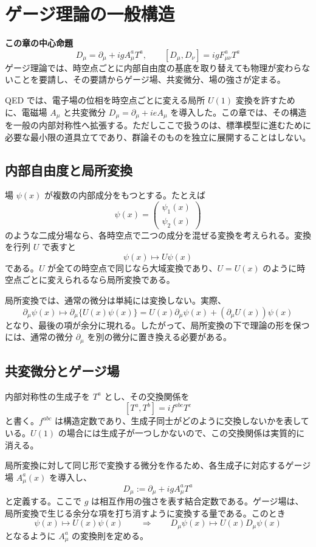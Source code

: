 \section{ゲージ理論の一般構造}

\noindent\textbf{この章の中心命題}
\[
\boxed{
D_\mu=\partial_\mu+igA_\mu^aT^a,
\qquad
[D_\mu,D_\nu]=igF_{\mu\nu}^aT^a
}
\]
ゲージ理論では、時空点ごとに内部自由度の基底を取り替えても物理が変わらないことを要請し、その要請からゲージ場、共変微分、場の強さが定まる。

QED では、電子場の位相を時空点ごとに変える局所 $U(1)$ 変換を許すために、電磁場 $A_\mu$ と共変微分 $D_\mu=\partial_\mu+ieA_\mu$ を導入した。この章では、その構造を一般の内部対称性へ拡張する。ただしここで扱うのは、標準模型に進むために必要な最小限の道具立てであり、群論そのものを独立に展開することはしない。

\subsection{内部自由度と局所変換}
場 $\psi(x)$ が複数の内部成分をもつとする。たとえば
\[
\psi(x)=
\begin{pmatrix}
\psi_1(x)\\
\psi_2(x)
\end{pmatrix}
\]
のような二成分場なら、各時空点で二つの成分を混ぜる変換を考えられる。変換を行列 $U$ で表すと
\[
\psi(x)\mapsto U\psi(x)
\]
である。$U$ が全ての時空点で同じなら大域変換であり、$U=U(x)$ のように時空点ごとに変えられるなら局所変換である。

局所変換では、通常の微分は単純には変換しない。実際、
\[
\partial_\mu\psi(x)
\mapsto
\partial_\mu\{U(x)\psi(x)\}
=
U(x)\partial_\mu\psi(x)+(\partial_\mu U(x))\psi(x)
\]
となり、最後の項が余分に現れる。したがって、局所変換の下で理論の形を保つには、通常の微分 $\partial_\mu$ を別の微分に置き換える必要がある。

\subsection{共変微分とゲージ場}
内部対称性の生成子を $T^a$ とし、その交換関係を
\[
[T^a,T^b]=if^{abc}T^c
\]
と書く。$f^{abc}$ は構造定数であり、生成子同士がどのように交換しないかを表している。$U(1)$ の場合には生成子が一つしかないので、この交換関係は実質的に消える。

局所変換に対して同じ形で変換する微分を作るため、各生成子に対応するゲージ場 $A_\mu^a(x)$ を導入し、
\[
D_\mu:=\partial_\mu+igA_\mu^aT^a
\]
と定義する。ここで $g$ は相互作用の強さを表す結合定数である。ゲージ場は、局所変換で生じる余分な項を打ち消すように変換する量である。このとき
\[
\psi(x)\mapsto U(x)\psi(x)
\qquad\Longrightarrow\qquad
D_\mu\psi(x)\mapsto U(x)D_\mu\psi(x)
\]
となるように $A_\mu^a$ の変換則を定める。

